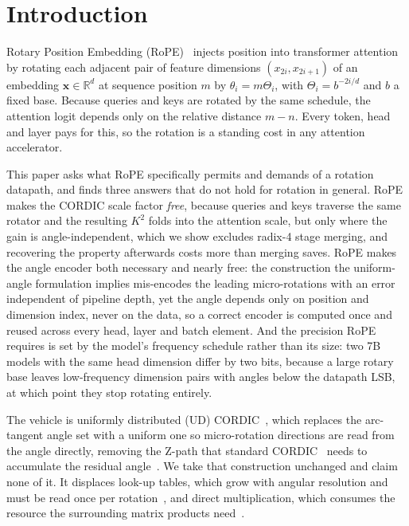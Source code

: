 \documentclass[conference]{IEEEtran}
\begin{document}
\section{Introduction}

Rotary Position Embedding (RoPE)~\cite{c9} injects position into transformer
attention
by rotating each adjacent pair of feature dimensions $(x_{2i}, x_{2i+1})$ of an
embedding $\mathbf{x} \in \mathbb{R}^{d}$ at sequence position $m$ by
$\theta_i = m\Theta_i$, with $\Theta_i = b^{-2i/d}$ and $b$ a fixed base. Because
queries and keys are rotated by the same schedule, the attention logit depends
only on the relative distance $m-n$. Every token, head and layer pays for this,
so the rotation is a standing cost in any attention accelerator.

This paper asks what RoPE specifically permits and demands of a rotation
datapath, and finds three answers that do not hold for rotation in general.
RoPE makes the CORDIC scale factor \emph{free}, because queries and keys
traverse the same rotator and the resulting $K^2$ folds into the attention
scale, but only where the gain is angle-independent, which we show excludes
radix-4 stage merging, and recovering the property afterwards costs more than
merging saves. RoPE makes the angle encoder both necessary and nearly free: the
construction the uniform-angle formulation implies mis-encodes the leading
micro-rotations with an error independent of pipeline depth, yet the angle
depends only on position and dimension index, never on the data, so a correct
encoder is computed once and reused across every head, layer and batch element.
And the precision RoPE requires is set by the model's frequency schedule rather
than its size: two 7B models with the same head dimension differ by two bits,
because a large rotary base leaves low-frequency dimension pairs with angles
below the datapath LSB, at which point they stop rotating entirely.

The vehicle is uniformly distributed (UD) CORDIC~\cite{ud}, which replaces the
arc-tangent angle set with a uniform one so micro-rotation directions are read
from the angle directly, removing the Z-path that standard
CORDIC~\cite{c2,c3,c15} needs to accumulate the residual
angle~\cite{c7,c10}. We take that construction unchanged and claim none of it.
It displaces look-up tables, which grow with angular resolution and must be read
once per rotation~\cite{c5}, and direct multiplication, which consumes the
resource the surrounding matrix products need~\cite{standard_cordic_rope}.
\end{document}
